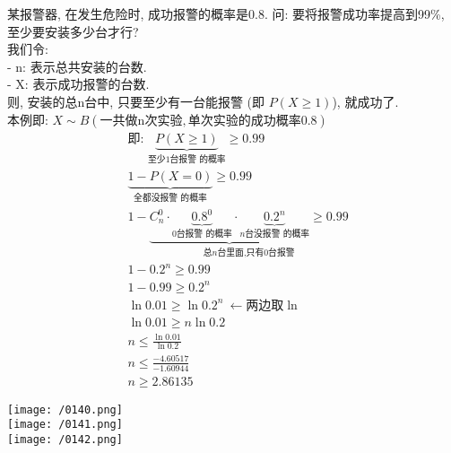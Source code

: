 \documentclass[UTF8]{ctexart}
\begin{document}
\begin{myEnvSample}
	某报警器, 在发生危险时, 成功报警的概率是0.8. 问: 要将报警成功率提高到99\%, 至少要安装多少台才行? \\
	我们令: \\
	- n: 表示总共安装的台数. \\
	- X: 表示成功报警的台数. \\	
	则, 安装的总n台中, 只要至少有一台能报警 (即 $P(X \geq 1)$), 就成功了. \\
	
	本例即: $X \sim B (\text{一共做n次实验},\text{单次实验的成功概率}0.8)$ 	
	\begin{align*}  %
	&\text{即:\ }\underset{\text{至少1台报警\ 的概率}}{\underbrace{P\left( X\ge 1 \right) }}\ge 0.99\\
&\underset{\text{全都没报警\ 的概率}}{\underbrace{1-P\left( X=0 \right) }}\ge 0.99\\
&1-\underset{\text{总}n\text{台里面,只有0台报警}}{\underbrace{C_{n}^{0}\cdot \underset{0\text{台报警\ 的概率}}{\underbrace{0.8^0}}\cdot \underset{n\text{台没报警\ 的概率}}{\underbrace{0.2^n}}}\ge 0.99}\\
&1-0.2^n\ge 0.99\\
&1-0.99\ge 0.2^n\\
&\ln 0.01\ge \ln 0.2^n\ \gets \text{两边取}\ln\\
&\ln 0.01\ge n\ln 0.2\\
&n\leq \frac{\ln 0.01}{\ln 0.2}\\
&n\leq \frac{-4.60517}{-1.60944}\\
&n\geq 2.86135
	\end{align*}
	
	\texttt{[image: /0140.png]} \\
	
	\texttt{[image: /0141.png]} \\
	
	\texttt{[image: /0142.png]} \\
	

\end{myEnvSample}
\vspace{1em} 
\end{document}
